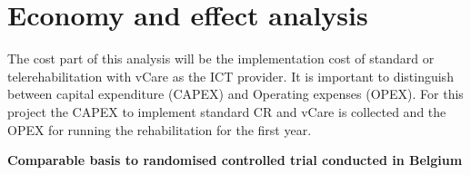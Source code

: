  


\section{Economy and effect analysis}

The cost part of this analysis will be the implementation cost of standard or telerehabilitation with vCare as the ICT provider. It is important to distinguish between capital expenditure (CAPEX) and Operating expenses (OPEX). For this project the CAPEX to implement standard CR and vCare is collected and the OPEX for running the rehabilitation for the first year. 

\textbf{Comparable basis to randomised controlled trial conducted in Belgium} \label{belgium}

